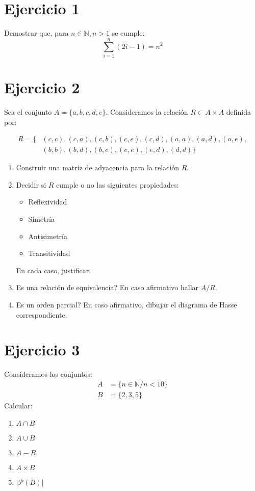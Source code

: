 \documentclass[12pt,a4paper]{article}
\begin{document}
\section*{Ejercicio 1}
Demostrar que, para $n \in \mathbb{N}, n>1$ se cumple:
\begin{equation*}
  \sum_{i=1}^{n}{(2i-1)} = n^2
\end{equation*}

\section*{Ejercicio 2}
Sea el conjunto $A= \{ a,b,c,d,e\}$. Consideramos la relaci\'on
$R\subset A \times A$ definida por:

\begin{align*}
  R = \{&(c,c),(c,a),(c,b),(c,e),(c,d),(a,a),(a,d),(a,e),\\
     & (b,b),(b,d),(b,e),(e,e),(e,d),(d,d)
  \}
\end{align*}

\begin{enumerate}
\item
  Construir una matriz de adyacencia para la relaci\'on $R$.
\item
  Decidir si $R$ cumple o no las siguientes propiedades:
  \begin{itemize}
  \item Reflexividad
  \item Simetr\'ia
  \item Antisimetr\'ia
  \item Transitividad
  \end{itemize}
  En cada caso, justificar.
\item
  Es una relaci\'on de equivalencia? En caso afirmativo hallar
  $A/R$.
\item
  Es un orden parcial? En caso afirmativo, dibujar el diagrama de Hasse
  correspondiente.
\end{enumerate}

\newpage
\section*{Ejercicio 3}
Consideramos los conjuntos:
\begin{align*}
  A &= \{ n \in \mathbb{N} / n < 10\} \\
  B &= \{ 2,3,5 \}
\end{align*}
Calcular:
\begin{enumerate}
\item $A \cap B$
\item $A \cup B$
\item $A-B$
\item $A \times B$
\item $|\mathcal{P}(B)|$
\end{enumerate}
\end{document}
